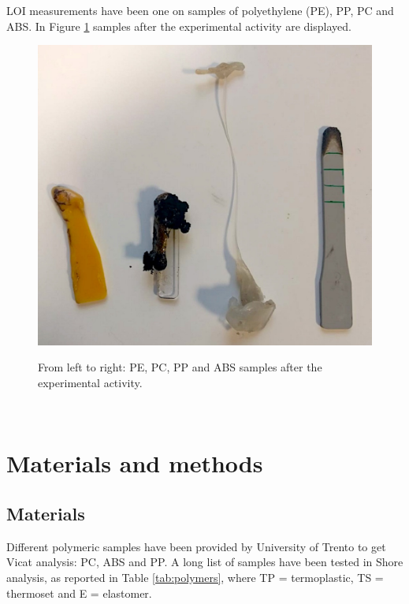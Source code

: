 \documentclass[a4paper, 11pt]{article}
\begin{document}
LOI measurements have been one on samples of polyethylene (PE), PP, PC and ABS. In Figure \ref{fig:LOI} samples after the experimental activity are displayed. 
\begin{figure}[h!]
	\centering
	{\includegraphics[scale=0.2]{LOI}}
	\captionsetup{justification=centering}
	\caption{From left to right: PE, PC, PP and ABS samples after the experimental activity.}
	\label{fig:LOI}
\end{figure}\\

\section{Materials and methods}

\subsection{Materials}

Different polymeric samples have been provided by University of Trento to get Vicat analysis: PC, ABS and PP. A long list of samples have been tested in Shore analysis, as reported in Table \ref{tab:polymers}, where TP = termoplastic, TS = thermoset and E = elastomer.
\end{document}
